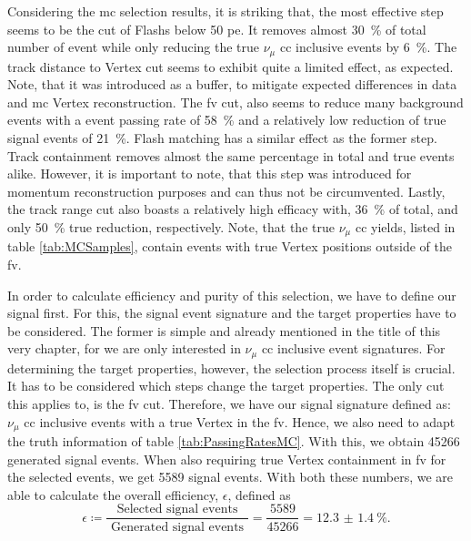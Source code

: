 Considering the \gls{mc} selection results, it is striking that, the most effective step seems to be the cut of \glspl{Flash} below \num{50} \gls{pe}. It removes almost \SI{30}{\percent} of total number of event while only reducing the true $\nu_\mu$ \gls{cc} inclusive events by \SI{6}{\percent}. The track distance to \gls{Vertex} cut seems to exhibit quite a limited effect, as expected. Note, that it was introduced as a buffer, to mitigate expected differences in data and \gls{mc} \gls{Vertex} reconstruction. The \gls{fv} cut, also seems to reduce many background events with a event passing rate of \SI{58}{\percent} and a relatively low reduction of true signal events of \SI{21}{\percent}. Flash matching has a similar effect as the former step. Track containment removes almost the same percentage in total and true events alike. However, it is important to note, that this step was introduced for momentum reconstruction purposes and can thus not be circumvented. Lastly, the track range cut also boasts a relatively high efficacy with, \SI{36}{\percent} of total, and only \SI{50}{\percent} true reduction, respectively. Note, that the true $\nu_\mu$ \gls{cc} yields, listed in table \ref{tab:MCSamples}, contain events with true \gls{Vertex} positions outside of the \gls{fv}.

In order to calculate efficiency and purity of this selection, we have to define our signal first. For this, the signal event signature and the target properties have to be considered. The former is simple and already mentioned in the title of this very chapter, for we are only interested in $\nu_\mu$ \gls{cc} inclusive event signatures. For determining the target properties, however, the selection process itself is crucial. It has to be considered which steps change the target properties. The only cut this applies to, is the \gls{fv} cut. Therefore, we have our signal signature defined as: $\nu_\mu$ \gls{cc} inclusive events with a true \gls{Vertex} in the \gls{fv}. Hence, we also need to adapt the truth information of table \ref{tab:PassingRatesMC}. With this, we obtain \num{45266} generated signal events. When also requiring true \gls{Vertex} containment in \gls{fv} for the selected events, we get \num{5589} signal events. With both these numbers, we are able to calculate the overall efficiency, $\epsilon$, defined as 
\begin{equation}
    \epsilon \coloneqq \frac{\text{ Selected signal events }}{\text{ Generated signal events }} = \frac{\num{5589}}{\num{45266}} = \SI{12.3(14)}{\percent}.
\end{equation}

